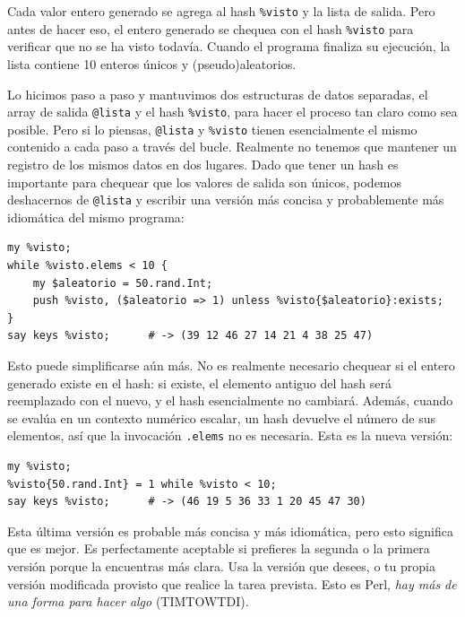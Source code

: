 Cada valor entero generado se agrega al hash \verb|%visto| 
y la lista de salida. Pero antes de hacer eso, el entero 
generado se chequea con el hash \verb|%visto| para verificar
que no se ha visto todavía. Cuando el programa finaliza su 
ejecución, la lista contiene 10 enteros únicos y (pseudo)aleatorios.

Lo hicimos paso a paso y mantuvimos dos estructuras de datos 
separadas, el array de salida \verb|@lista| y el hash \verb|%visto|,
para hacer el proceso tan claro como sea posible. Pero si lo piensas,
\verb|@lista| y \verb|%visto| tienen esencialmente el mismo contenido
a cada paso a través del bucle. Realmente no tenemos que mantener un
registro de los mismos datos en dos lugares. Dado que tener un hash
es importante para chequear que los valores de salida son únicos, 
podemos deshacernos de \verb|@lista| y escribir una versión más
concisa y probablemente más idiomática del mismo programa:

\begin{lstlisting}
my %visto;
while %visto.elems < 10 {
	my $aleatorio = 50.rand.Int;
	push %visto, ($aleatorio => 1) unless %visto{$aleatorio}:exists;
}
say keys %visto;      # -> (39 12 46 27 14 21 4 38 25 47)
\end{lstlisting}

Esto puede simplificarse aún más. No es realmente necesario
chequear si el entero generado existe en el hash: si existe,
el elemento antiguo del hash será reemplazado con el nuevo, 
y el hash esencialmente no cambiará. Además, cuando se evalúa
en un contexto numérico escalar, un hash devuelve el número de
sus elementos, así que la invocación {\tt .elems} no es necesaria.
Esta es la nueva versión:

\begin{lstlisting}
my %visto;
%visto{50.rand.Int} = 1 while %visto < 10;
say keys %visto;      # -> (46 19 5 36 33 1 20 45 47 30)
\end{lstlisting}

Esta última versión es probable más concisa y más idiomática,
pero esto significa que es mejor. Es perfectamente aceptable
si prefieres la segunda o la primera versión porque la encuentras
más clara. Usa la versión que desees, o tu propia versión modificada
provisto que realice la tarea prevista. Esto es Perl, \emph{
hay más de una forma para hacer algo} (TIMTOWTDI).


